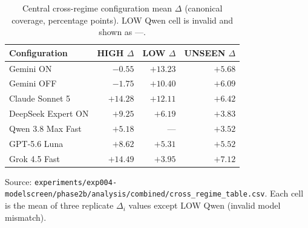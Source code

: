 \begin{table}[t]
\centering
\caption{Central cross-regime configuration mean $\Delta$ (canonical coverage, percentage points).
LOW Qwen cell is invalid and shown as ---.}
\label{tab:deltas}
\begin{tabular}{@{}lrrr@{}}
\toprule
\textbf{Configuration} & \textbf{HIGH $\Delta$} & \textbf{LOW $\Delta$} & \textbf{UNSEEN $\Delta$} \\
\midrule
Gemini ON & $-0.55$ & $+13.23$ & $+5.68$ \\
Gemini OFF & $-1.75$ & $+10.40$ & $+6.09$ \\
Claude Sonnet 5 & $+14.28$ & $+12.11$ & $+6.42$ \\
DeepSeek Expert ON & $+9.25$ & $+6.19$ & $+3.83$ \\
Qwen 3.8 Max Fast & $+5.18$ & --- & $+3.52$ \\
GPT-5.6 Luna & $+8.62$ & $+5.31$ & $+5.52$ \\
Grok 4.5 Fast & $+14.49$ & $+3.95$ & $+7.12$ \\
\bottomrule
\end{tabular}
\begin{flushleft}
\footnotesize
Source: \texttt{experiments/exp004-modelscreen/phase2b/analysis/combined/cross\_regime\_table.csv}.
Each cell is the mean of three replicate $\Delta_i$ values except LOW Qwen (invalid model mismatch).
\end{flushleft}
\end{table}
